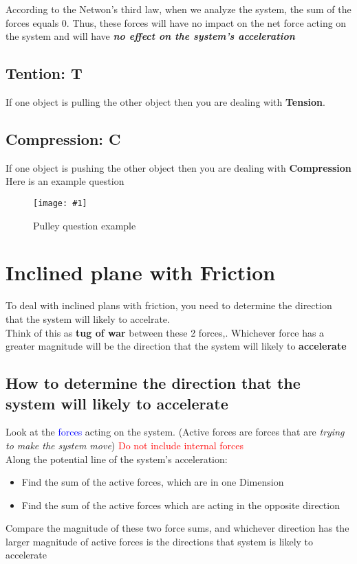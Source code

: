 \documentclass[11pt]{report}
\theoremstyle{remark}
\newcommand{\mypic}[3]{
    \begin{figure}[h!]
        \centering
        \texttt{[image: \#1]}
        \caption{#2}
    \end{figure}
}
\begin{document}
According to the Netwon's third law, when we analyze the system, the sum of the forces equals 0. 
Thus, these forces will have no impact on the net force acting on the system and will have 
\textbf{\textit{no effect on the system's acceleration}}

\subsection{Tention: T}
If one object is pulling the other object then you are dealing with \textbf{Tension}.

\subsection{Compression: C}
If one object is pushing the other object then you are dealing with \textbf{Compression}
\\

Here is an example question
\mypic{graph/example10.png}{Pulley question example}{0.6}

\section{Inclined plane with Friction}
To deal with inclined plans with friction, you need to determine the direction that the system will likely to accelrate. 
\\

Think of this as \textbf{tug of war} between these 2 forces,. Whichever force has a greater magnitude will be the direction that the system will 
likely to \textbf{accelerate}

\subsection{How to determine the direction that the system will likely to accelerate}
Look at the \textcolor{blue}{forces} acting on the system. (Active forces are forces that are \textit{trying to make the system move})
\textcolor{red}{Do not include internal forces} \\

Along the potential line of the system's acceleration:
\begin{itemize}
    \item Find the sum of the active forces, which are in one Dimension
    \item Find the sum of the active forces which are acting in the opposite direction
\end{itemize}
Compare the magnitude of these two force sums, and whichever direction has the larger magnitude of active forces is the directions that 
system is likely to accelerate
\end{document}

